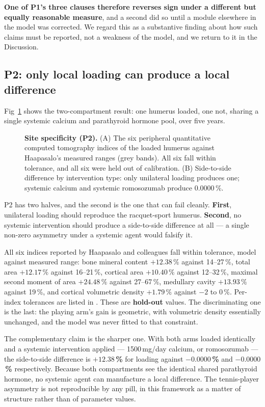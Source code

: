 \documentclass[10pt,letterpaper]{article}
\begin{document}
\textbf{One of P1's three clauses therefore reverses sign under a different but
equally reasonable measure}, and a second did so until a module elsewhere in the
model was corrected. We regard this as a substantive finding about how
such claims must be reported, not a weakness of the model, and we return to it
in the Discussion.

\subsection*{P2: only local loading can produce a local difference}

Fig~\ref{fig6} shows the two-compartment result: one humerus loaded, one not,
sharing a single systemic calcium and parathyroid hormone pool, over five
years.

\begin{figure}[!h]
\caption{{\bf Site specificity (P2).}
(A) The six peripheral quantitative computed tomography indices of the loaded
humerus against Haapasalo's measured ranges (grey bands). All six fall within
tolerance, and all six were held out of calibration. (B) Side-to-side
difference by intervention type: only unilateral loading produces one;
systemic calcium and systemic romosozumab produce 0.0000\,\%.}
\label{fig6}
\end{figure}

P2 has two halves, and the second is the one that can fail cleanly.
\textbf{First}, unilateral loading should reproduce the racquet-sport
humerus. \textbf{Second}, no systemic intervention should produce a
side-to-side difference at all --- a single non-zero asymmetry under a
systemic agent would falsify it.

All six indices reported by Haapasalo and colleagues \cite{haapasalo2000} fall
within tolerance, model against measured range: bone mineral content
$+12.38\,\%$ against 14--27\,\%, total area $+12.17\,\%$ against
16--21\,\%, cortical area $+10.40\,\%$ against 12--32\,\%, maximal second
moment of area $+24.48\,\%$ against 27--67\,\%, medullary cavity
$+13.93\,\%$ against 19\,\%, and cortical volumetric density $+1.79\,\%$
against $-2$ to $0\,\%$. Per-index tolerances are listed in
. These are \textbf{hold-out} values. The discriminating one is the last: the
playing arm's gain is geometric, with volumetric density essentially
unchanged, and the model was never fitted to that constraint.

The complementary claim is the sharper one. With both arms loaded identically
and a systemic intervention applied --- 1500\,mg/day calcium, or romosozumab
--- the side-to-side difference is \textbf{$+12.38$\,\%} for loading against
\textbf{$-0.0000$\,\%} and \textbf{$-0.0000$\,\%} respectively. Because both compartments see the
identical shared parathyroid hormone, no systemic agent can manufacture a
local difference. The tennis-player asymmetry is not reproducible by any pill,
in this framework as a matter of structure rather than of parameter values.
\end{document}

